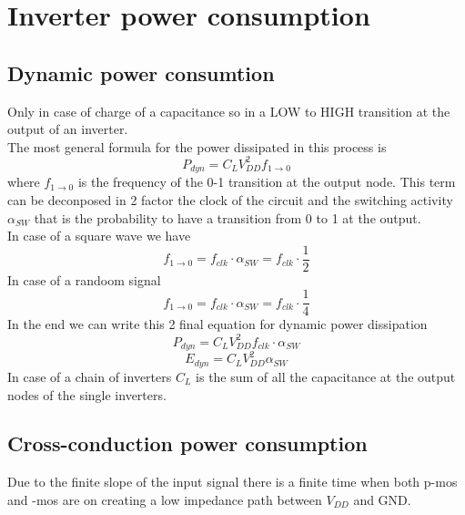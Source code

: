 \chapter{Inverter power consumption}

\section{Dynamic power consumtion}
Only in case of charge of a capacitance so in a LOW to HIGH transition at the output of an inverter. \\
The most general formula for the power dissipated in this process is
\begin{equation}
P_{dyn}=C_LV_{DD}^2f_{1\rightarrow 0}
\end{equation}
where $f_{1\rightarrow 0}$ is the frequency of the 0-1 transition at the output node. This term can be deconposed in 2 factor the clock of the circuit and the switching activity $\alpha_{SW}$ that is the probability to have a transition from 0 to 1 at the output.\\
\vspace{2mm}
\tab In case of a square wave we have 
\begin{equation}
f_{1\rightarrow 0}=f_{clk}\cdot \alpha_{SW}=f_{clk}\cdot \frac{1}{2}
\end{equation}
\tab In case of a randoom signal 
\begin{equation}
f_{1\rightarrow 0}=f_{clk}\cdot \alpha_{SW}=f_{clk}\cdot \frac{1}{4}
\end{equation}
\vspace{5mm}
In the end we can write this 2 final equation for dynamic power dissipation
\begin{equation}
P_{dyn}=C_LV_{DD}^2 f_{clk}\cdot \alpha_{SW}
\end{equation}
\begin{equation}
E_{dyn}=C_LV_{DD}^2\alpha_{SW}
\end{equation}
In case of a chain of inverters $C_L$ is the sum of all the capacitance at the output nodes of the single inverters.\\

\section{Cross-conduction power consumption}
Due to the finite slope of the input signal there is a finite time when both p-mos and -mos are on creating a low impedance path between $V_{DD}$ and GND.\\

